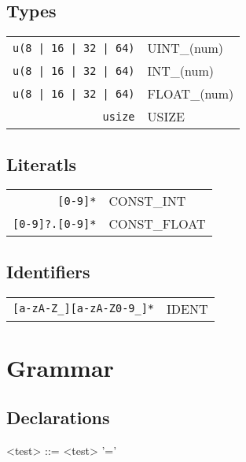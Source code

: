 \documentclass{article}
\begin{document}
		\subsection{Types}	
			\begin{tabular}{rl}
				\texttt{u(8 | 16 | 32 | 64)} & UINT\_(num)\\
				\texttt{u(8 | 16 | 32 | 64)} & INT\_(num)\\
				\texttt{u(8 | 16 | 32 | 64)}  & FLOAT\_(num)\\
				\texttt{usize} & USIZE\\ 
			\end{tabular}
		\subsection{Literatls}
			\begin{tabular}{rl}
				\texttt{[0-9]*} & CONST\_INT\\
				\texttt{[0-9]?.[0-9]*} & CONST\_FLOAT\\
			\end{tabular}
		\subsection{Identifiers}
			\begin{tabular}{rl}
				\texttt{[a-zA-Z\_][a-zA-Z0-9\_]*} & IDENT\\
			\end{tabular}	
	\section{Grammar}
		\subsection{Declarations}
			\begin{grammar}
				<test> ::= <test> '=' 
			\end{grammar}
			
\end{document}
